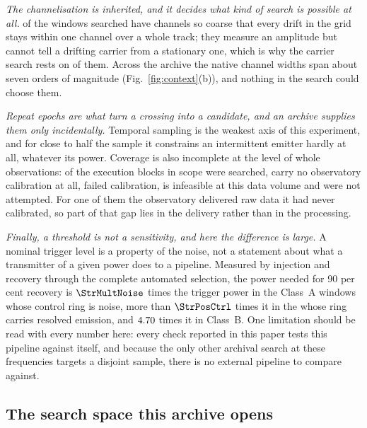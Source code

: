 \emph{The channelisation is inherited, and it decides what kind of search is
possible at all.} \NCoarse{} of the \NWindows{} windows searched have channels
so coarse that every drift in the grid stays within one channel over a whole
track; they measure an amplitude but cannot tell a drifting carrier from a
stationary one, which is why the carrier search rests on \NWinA{} of them.
Across the archive the native channel widths span about seven orders of
magnitude (Fig.~\ref{fig:context}(b)), and nothing in the search could choose
them.

\emph{Repeat epochs are what turn a crossing into a candidate, and an archive
supplies them only incidentally.} Temporal sampling is the weakest axis of
this experiment, and for close to half the sample it constrains an
intermittent emitter hardly at all, whatever its power. Coverage is also
incomplete at the level of whole observations: \FateDone{} of the
\FateScope{} execution blocks in scope were searched, \FateNoCal{} carry no
observatory calibration at all, \FateCalFail{} failed calibration,
\FateInfeas{} is infeasible at this data volume and \FateUnattempted{} were
not attempted. For one of them the observatory delivered raw data it had
never calibrated, so part of that gap lies in the delivery rather than in the
processing.

\emph{Finally, a threshold is not a sensitivity, and here the difference is
large.} A nominal trigger level is a property of the noise, not a statement
about what a transmitter of a given power does to a pipeline. Measured by
injection and recovery through the complete automated selection, the power
needed for 90 per cent recovery is $\StrMultNoise$ times the trigger power in
the Class~A windows whose control ring is noise, more than $\StrPosCtrl$
times it in the \StrNDiscWin{} whose ring carries resolved emission, and
$4.70$ times it in Class~B. One limitation should be read
with every number here: every check reported in this paper tests this
pipeline against itself, and because the only other archival search at these
frequencies targets a disjoint sample, there is no external pipeline to
compare against.

\subsection{The search space this archive opens}
\label{sec:newspace}

